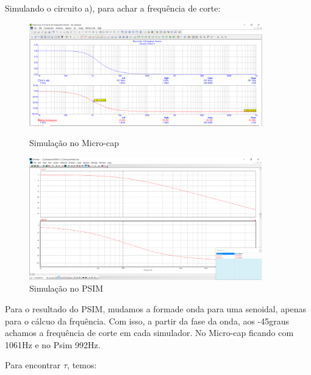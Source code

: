     Simulando o circuito a), para achar a frequência de corte:
\begin{figure}[!htb]
    \begin{minipage}{0.5\textwidth}
    \centering
    \includegraphics[width = 0.9\textwidth]{Relatorio1_microcap_Bode.png}
    \caption{Simulação no Micro-cap\cite{microcap}}
    \end{minipage}\hfill
    \begin{minipage}{0.5\textwidth}
    \centering
    \includegraphics[width = 0.9\textwidth]{Relatorio1_PSIM_Bode.png}
    \caption{Simulação no PSIM\cite{psim}}
    \end{minipage}\hfill
\end{figure}

    Para o resultado do PSIM, mudamos a formade onda para uma senoidal, apenas para o cálcuo da frquência. Com isso, a partir da fase da onda, aos -45graus achamos a frequência de corte em cada simulador. No Micro-cap ficando com 1061Hz e no Psim 992Hz. 
    
    Para encontrar $\tau$, temos:
    
